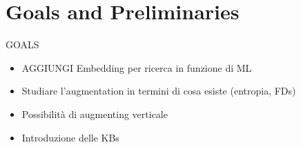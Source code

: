 \section{Goals and Preliminaries}\label{goals}
GOALS
\begin{itemize}
    \item AGGIUNGI Embedding per ricerca in funzione di ML
    \item Studiare l'augmentation in termini di cosa esiste (entropia, FDs)
    \item Possibilità di augmenting verticale
    \item Introduzione delle KBs
\end{itemize}